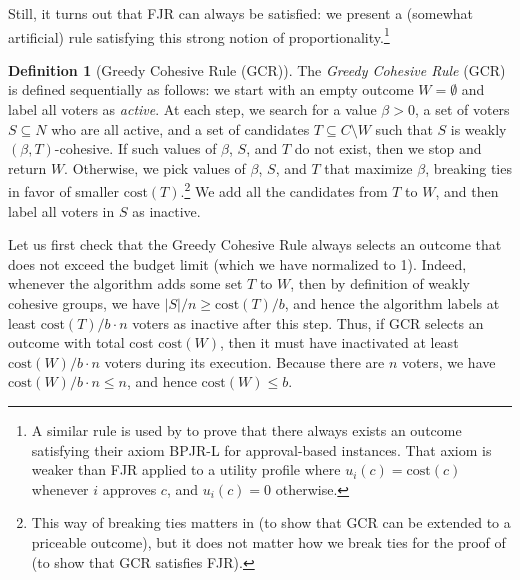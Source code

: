 \documentclass[10pt]{scrartcl}
\renewcommand*{\le}{\leqslant}
\renewcommand*{\geq}{\geqslant}
\newcommand{\cost}{{{\mathrm{cost}}}}
\theoremstyle{definition}
\newtheorem{definition}{Definition}
\theoremstyle{plain}
\begin{document}
Still, it turns out that FJR can always be satisfied: we present a (somewhat artificial) rule satisfying this strong notion of proportionality.\footnote{A similar rule is used by \citet[Proposition 3.7]{aziz2018proportionally} to prove that there always exists an outcome satisfying their axiom BPJR-L for approval-based instances. That axiom is weaker than FJR applied to a utility profile where $u_i(c) = \cost(c)$ whenever $i$ approves $c$, and $u_i(c) = 0$ otherwise.}

\begin{definition}[Greedy Cohesive Rule (GCR)]\label{def:gcr}
The \emph{Greedy Cohesive Rule} (GCR) is defined sequentially as follows: we start with an empty outcome $W=\emptyset$ and label all voters as \emph{active}. At each step, we search for a value $\beta > 0$, a set of voters $S\subseteq N$ who are all active, and a set of candidates $T\subseteq C \setminus W$ such that $S$ is weakly $(\beta, T)$-cohesive. If such values of $\beta$, $S$, and $T$ do not exist, then we stop and return $W$. Otherwise, we pick values of $\beta$, $S$, and $T$ that maximize $\beta$, breaking ties in favor of smaller $\cost(T)$.\footnote{This way of breaking ties matters in  (to show that GCR can be extended to a priceable outcome), but it does not matter how we break ties for the proof of  (to show that GCR satisfies FJR).}
We add all the candidates from $T$ to $W$, and then label all voters in $S$ as inactive.
\end{definition}

Let us first check that the Greedy Cohesive Rule always selects an outcome that does not exceed the budget limit (which we have normalized to 1). Indeed, whenever the algorithm adds some set $T$ to $W$, then by definition of weakly cohesive groups, we have $|S|/n \geq \cost(T)/b$, and hence the algorithm labels at least $\cost(T)/b\cdot n$ voters as inactive after this step. Thus, if GCR selects an outcome with total cost  $\cost(W)$, then it must have inactivated at least $\cost(W)/b\cdot n$ voters during its execution. Because there are $n$ voters, we have $\cost(W)/b \cdot n \le n$, and hence $\cost(W) \le b$.
\end{document}
